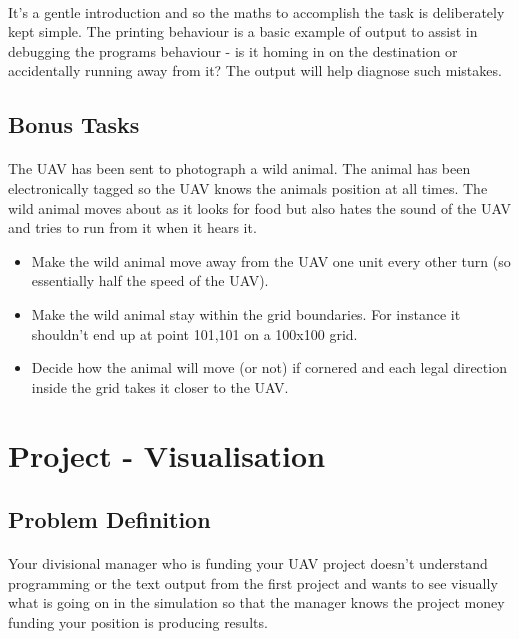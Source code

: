 \documentclass[11pt]{book}
\begin{document}
\paragraph{} It's a gentle introduction and so the maths to accomplish the
task is deliberately kept simple. The printing behaviour is a basic example of
output to assist in debugging the programs behaviour - is it homing in on the
destination or accidentally running away from it? The output will help
diagnose such mistakes.

\subsection{Bonus Tasks}

\paragraph{} The UAV has been sent to photograph a wild animal. The animal has
been electronically tagged so the UAV knows the animals position at all times.
The wild animal moves about as it looks for food but also hates the sound of
the UAV and tries to run from it when it hears it.

\begin{itemize}
\item Make the wild animal move away from the UAV one unit every other turn (so essentially half the speed of the UAV).
\item Make the wild animal stay within the grid boundaries. For instance it shouldn't end up at point 101,101 on a 100x100 grid.
\item Decide how the animal will move (or not) if cornered and each legal direction inside the grid takes it closer to the UAV.
\end{itemize}

\clearpage

\section{Project - Visualisation}

\subsection{Problem Definition}

\paragraph{} Your divisional manager who is funding your UAV project doesn't
understand programming or the text output from the first project and wants to
see visually what is going on in the simulation so that the manager knows the
project money funding your position is producing results.
\end{document}
